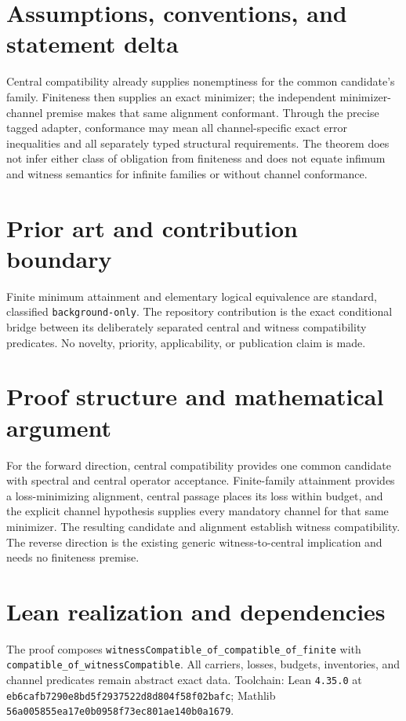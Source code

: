 \documentclass[11pt]{article}
\begin{document}
\section{Assumptions, conventions, and statement delta}
Central compatibility already supplies nonemptiness for the common candidate's family.  Finiteness then supplies an exact minimizer; the independent minimizer-channel premise makes that same alignment conformant.  Through the precise tagged adapter, conformance may mean all channel-specific exact error inequalities and all separately typed structural requirements.  The theorem does not infer either class of obligation from finiteness and does not equate infimum and witness semantics for infinite families or without channel conformance.

\section{Prior art and contribution boundary}
Finite minimum attainment and elementary logical equivalence are standard, classified \texttt{background-only}.  The repository contribution is the exact conditional bridge between its deliberately separated central and witness compatibility predicates.  No novelty, priority, applicability, or publication claim is made.

\section{Proof structure and mathematical argument}
For the forward direction, central compatibility provides one common candidate with spectral and central operator acceptance.  Finite-family attainment provides a loss-minimizing alignment, central passage places its loss within budget, and the explicit channel hypothesis supplies every mandatory channel for that same minimizer.  The resulting candidate and alignment establish witness compatibility.  The reverse direction is the existing generic witness-to-central implication and needs no finiteness premise.

\section{Lean realization and dependencies}
The proof composes \texttt{witnessCompatible\_of\_compatible\_of\_finite} with \texttt{compatible\_of\_witnessCompatible}.  All carriers, losses, budgets, inventories, and channel predicates remain abstract exact data.  Toolchain: Lean \texttt{4.35.0} at \texttt{eb6cafb7290e8bd5f2937522d8d804f58f02bafc}; Mathlib \texttt{56a005855ea17e0b0958f73ec801ae140b0a1679}.
\end{document}
